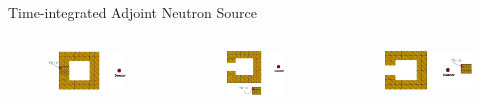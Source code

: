 \documentclass{beamer}
\begin{document}
\begin{frame}{Time-integrated Adjoint Neutron Source}
	\begin{columns}
		\begin{column}{0.3\textwidth}
        \begin{figure}
	\centering
	\includegraphics[scale=0.20]{mesh-0.jpg}
	\end{figure}
\end{column}
\vrule{}
		\begin{column}{0.3\textwidth}
		\vspace{0.6cm}
        \begin{figure}
	\centering
	\includegraphics[scale=0.20]{mesh-3.jpg}
	\end{figure}
\end{column}
\vrule{}
		\begin{column}{0.3\textwidth}
		\vspace{-0.4cm}
        \begin{figure}
	\centering
	\includegraphics[scale=0.20]{mesh-5.jpg}
	\end{figure}
\end{column}
	\end{columns}
\end{frame}
\end{document}
